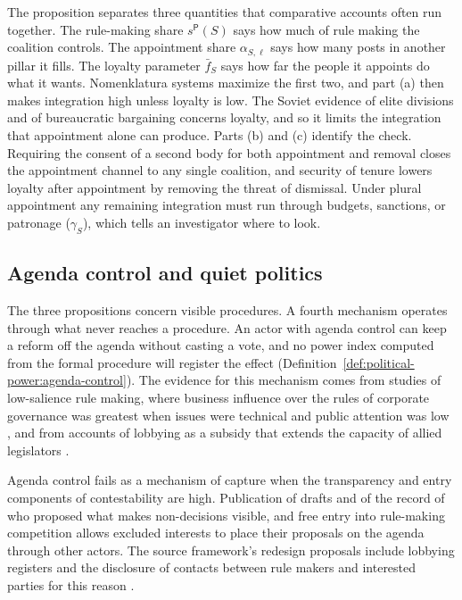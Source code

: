 \documentclass[11pt,letterpaper]{article}
\theoremstyle{definition}
\theoremstyle{remark}
\newcommand{\pP}{\mathsf{P}}
\begin{document}
The proposition separates three quantities that comparative accounts often run together. The rule-making share $s^{\pP}(S)$ says how much of rule making the coalition controls. The appointment share $\alpha_{S,\ell}$ says how many posts in another pillar it fills. The loyalty parameter $\bar f_S$ says how far the people it appoints do what it wants. Nomenklatura systems maximize the first two, and part (a) then makes integration high unless loyalty is low. The Soviet evidence of elite divisions \citep{lane1995} and of bureaucratic bargaining \citep{hough1979} concerns loyalty, and so it limits the integration that appointment alone can produce. Parts (b) and (c) identify the check. Requiring the consent of a second body for both appointment and removal closes the appointment channel to any single coalition, and security of tenure lowers loyalty after appointment by removing the threat of dismissal. Under plural appointment any remaining integration must run through budgets, sanctions, or patronage ($\gamma_S$), which tells an investigator where to look.

\subsection{Agenda control and quiet politics}

The three propositions concern visible procedures. A fourth mechanism operates through what never reaches a procedure. An actor with agenda control can keep a reform off the agenda without casting a vote, and no power index computed from the formal procedure will register the effect (Definition~\ref{def:political-power:agenda-control}). The evidence for this mechanism comes from studies of low-salience rule making, where business influence over the rules of corporate governance was greatest when issues were technical and public attention was low \citep{culpepper2010}, and from accounts of lobbying as a subsidy that extends the capacity of allied legislators \citep{hall2006}.

Agenda control fails as a mechanism of capture when the transparency and entry components of contestability are high. Publication of drafts and of the record of who proposed what makes non-decisions visible, and free entry into rule-making competition allows excluded interests to place their proposals on the agenda through other actors. The source framework's redesign proposals include lobbying registers and the disclosure of contacts between rule makers and interested parties for this reason \citep[Section~11]{largo2026hbs}.
\end{document}
